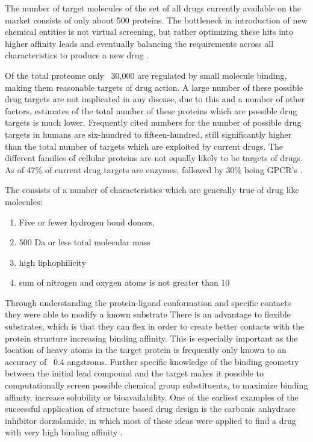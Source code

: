 The number of target molecules of the set of all drugs currently available on the market consists of only about 500 proteins.
The bottleneck in introduction of new chemical entities is not virtual screening, but rather optimizing these hits into higher affinity leads and eventually balancing the requirements across all characteristics to produce a new drug \cite{bleicher2003hit}.

Of the total proteome only ~30,000 are regulated by small molecule binding, making them reasonable targets of drug action.
A large number of these possible drug targets are not implicated in any disease, due to this and a number of other factors, estimates of the total number of these proteins which are possible drug targets is much lower.
Frequently cited numbers for the number of possible drug targets in humans are six-hundred to fifteen-hundred, still significantly higher than the total number of targets which are exploited by current drugs.
The different families of cellular proteins are not equally likely to be targets of drugs.
As of {\the\year} 47\% of current drug targets are enzymes, followed by 30\% being GPCR's \cite{hopkins2002druggable}.

The consists of a number of characteristics which are generally true of drug like molecules:
\begin{enumerate}
\item Five or fewer hydrogen bond donors,
\item 500 Da or less total molecular mass
\item high liphophilicity
\item sum of nitrogen and oxygen atoms is not greater than 10 \cite{rule_of_five}
\end{enumerate}

Through understanding the protein-ligand conformation and specific contacts they were able to modify a known substrate 
There is an advantage to flexible substrates, which is that they can flex in order to create better contacts with the protein structure increasing binding affinity.
This is especially important as the location of heavy atoms in the target protein is frequently only known to an accuracy of ~0.4 angstroms.
Further specific knowledge of the binding geometry between the initial lead compound and the target makes it possible to computationally screen possible chemical group substituents, to maximize binding affinity, increase solubility or bioavailability.
One of the earliest examples of the successful application of structure based drug design is the carbonic anhydrase inhibitor dorzolamide, in which most of these ideas were applied to find a drug with very high binding affinity \cite{greer1994application}.

